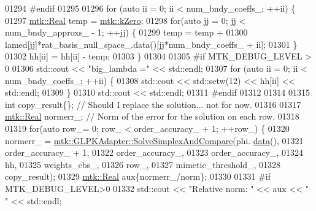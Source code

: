 \begin{DoxyCode}
{{01294 \textcolor{preprocessor}{    #endif}
01295 
01296     \textcolor{keywordflow}{for} (\textcolor{keyword}{auto} ii = 0; ii < num\_bndy\_coeffs\_; ++ii) \{
01297       \hyperlink{group__c01-roots_gac080bbbf5cbb5502c9f00405f894857d}{mtk::Real} temp = \hyperlink{group__c01-roots_ga59a451a5fae30d59649bcda274fea271}{mtk::kZero};
01298       \textcolor{keywordflow}{for}(\textcolor{keyword}{auto} jj = 0; jj < num\_bndy\_approxs\_ - 1; ++jj) \{
01299         temp = temp +
01300           lamed[jj]*rat\_basis\_null\_space\_.data()[jj*num\_bndy\_coeffs\_ + ii];
01301       \}
01302       hh[ii] = hh[ii] - temp;
01303     \}
01304 
01305 \textcolor{preprocessor}{    #if MTK\_DEBUG\_LEVEL > 0}
01306     std::cout << \textcolor{stringliteral}{"big\_lambda ="} << std::endl;
01307     \textcolor{keywordflow}{for} (\textcolor{keyword}{auto} ii = 0; ii < num\_bndy\_coeffs\_; ++ii) \{
01308       std::cout << std::setw(12) << hh[ii] << std::endl;
01309     \}
01310     std::cout << std::endl;
01311 \textcolor{preprocessor}{    #endif}
01312 
01314 
01315     \textcolor{keywordtype}{int} copy\_result\{\};  \textcolor{comment}{// Should I replace the solution... not for now.}
01316 
01317     \hyperlink{group__c01-roots_gac080bbbf5cbb5502c9f00405f894857d}{mtk::Real} normerr\_; \textcolor{comment}{// Norm of the error for the solution on each row.}
01318 
01319     \textcolor{keywordflow}{for}(\textcolor{keyword}{auto} row\_= 0; row\_ < order\_accuracy\_ + 1; ++row\_) \{
01320       normerr\_ = \hyperlink{classmtk_1_1GLPKAdapter_a834480aca83e3c0d09fdab7fdb7e8a3f}{mtk::GLPKAdapter::SolveSimplexAndCompare}(phi.
      \hyperlink{classmtk_1_1DenseMatrix_a0c33b8a9e01d157c61ddbdf807c25d84}{data}(),
01321                                                           order\_accuracy\_ + 1,
01322                                                           order\_accuracy\_,
01323                                                           order\_accuracy\_,
01324                                                           hh,
01325                                                           weights\_cbs\_,
01326                                                           row\_,
01327                                                           mimetic\_threshold\_,
01328                                                           copy\_result);
01329       \hyperlink{group__c01-roots_gac080bbbf5cbb5502c9f00405f894857d}{mtk::Real} aux\{normerr\_/norm\};
01330 
01331 \textcolor{preprocessor}{      #if MTK\_DEBUG\_LEVEL>0}
01332       std::cout << \textcolor{stringliteral}{"Relative norm: "} << aux << \textcolor{stringliteral}{" "} << std::endl;
}}
\end{DoxyCode}
